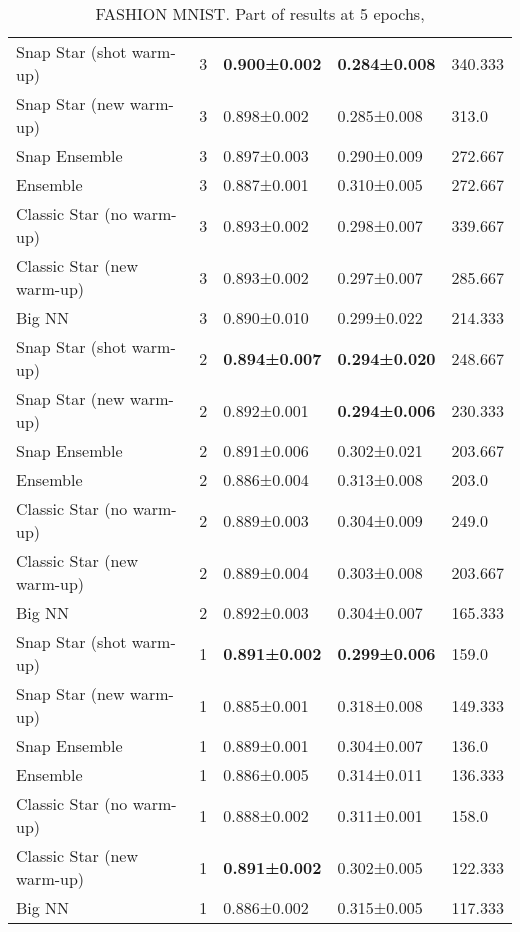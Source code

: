 \begin{table}[ht!]
{\begin{tabular}{|l|llll|}
\hline
Snap Star (shot warm-up)   & 3 & \textbf{0.900±0.002} & \textbf{0.284±0.008} & 340.333 \\
Snap Star (new warm-up)    & 3 & 0.898±0.002 & 0.285±0.008 & 313.0   \\
Snap Ensemble           & 3 & 0.897±0.003 & 0.290±0.009 & 272.667 \\
Ensemble                & 3 & 0.887±0.001 & 0.310±0.005 & 272.667 \\
Classic Star (no warm-up)  & 3 & 0.893±0.002 & 0.298±0.007 & 339.667 \\
Classic Star (new warm-up) & 3 & 0.893±0.002 & 0.297±0.007 & 285.667 \\
Big NN                  & 3 & 0.890±0.010 & 0.299±0.022 & 214.333 \\
\hline
Snap Star (shot warm-up)   & 2 & \textbf{0.894±0.007} & \textbf{0.294±0.020} & 248.667 \\
Snap Star (new warm-up)    & 2 & 0.892±0.001 & \textbf{0.294±0.006} & 230.333 \\
Snap Ensemble           & 2 & 0.891±0.006 & 0.302±0.021 & 203.667 \\
Ensemble                & 2 & 0.886±0.004 & 0.313±0.008 & 203.0   \\
Classic Star (no warm-up)  & 2 & 0.889±0.003 & 0.304±0.009 & 249.0   \\
Classic Star (new warm-up) & 2 & 0.889±0.004 & 0.303±0.008 & 203.667 \\
Big NN                  & 2 & 0.892±0.003 & 0.304±0.007 & 165.333 \\
\hline
Snap Star (shot warm-up)   & 1 & \textbf{0.891±0.002} & \textbf{0.299±0.006} & 159.0   \\
Snap Star (new warm-up)    & 1 & 0.885±0.001 & 0.318±0.008 & 149.333 \\
Snap Ensemble           & 1 & 0.889±0.001 & 0.304±0.007 & 136.0   \\
Ensemble                & 1 & 0.886±0.005 & 0.314±0.011 & 136.333 \\
Classic Star (no warm-up)  & 1 & 0.888±0.002 & 0.311±0.001 & 158.0   \\
Classic Star (new warm-up) & 1 & \textbf{0.891±0.002} & 0.302±0.005 & 122.333 \\
Big NN                  & 1 & 0.886±0.002 & 0.315±0.005 & 117.333 \\
\hline
\end{tabular}
}
\caption{FASHION MNIST. Part of results at 5 epochs, }
\label{table:fmnist5}
\end{table} \begin{table}

\end{table}
